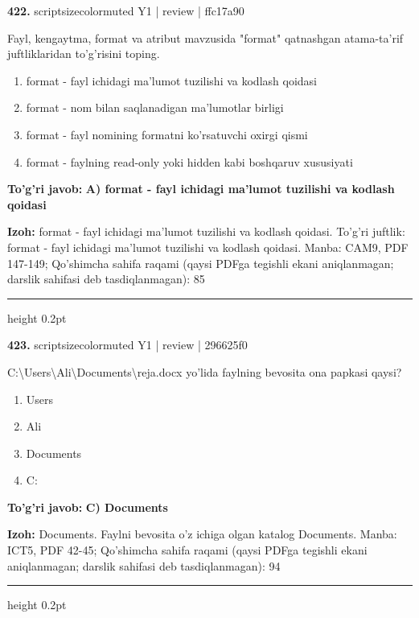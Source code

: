 \documentclass[10pt,a4paper]{article}
\begin{document}
{\bfseries\sffamily\color{ink} 422.} {scriptsizecolor{muted} Y1 | review | ffc17a90}
\par
Fayl, kengaytma, format va atribut mavzusida "format" qatnashgan atama-ta'rif juftliklaridan to'g'risini toping.
\begin{enumerate}[label=\Alph*),leftmargin=9mm]
\item format - fayl ichidagi ma'lumot tuzilishi va kodlash qoidasi
\item format - nom bilan saqlanadigan ma'lumotlar birligi
\item format - fayl nomining formatni ko'rsatuvchi oxirgi qismi
\item format - faylning read-only yoki hidden kabi boshqaruv xususiyati
\end{enumerate}
\begin{tcolorbox}[enhanced,breakable,colback=teal!4,colframe=teal!60!black,boxrule=0.45pt,arc=1.2mm,left=2.7mm,right=2.7mm,top=1.8mm,bottom=1.8mm,before skip=2mm,after skip=2mm]
{\bfseries\sffamily\color{teal}To'g'ri javob:} \textbf{A) format - fayl ichidagi ma'lumot tuzilishi va kodlash qoidasi}
\par\smallskip
{\bfseries Izoh:} format - fayl ichidagi ma'lumot tuzilishi va kodlash qoidasi. To'g'ri juftlik: format - fayl ichidagi ma'lumot tuzilishi va kodlash qoidasi. Manba: CAM9, PDF 147-149; Qo'shimcha sahifa raqami (qaysi PDFga tegishli ekani aniqlanmagan; darslik sahifasi deb tasdiqlanmagan): 85
\end{tcolorbox}
\vspace{2mm}\hrule height 0.2pt\vspace{3mm}

{\bfseries\sffamily\color{ink} 423.} {scriptsizecolor{muted} Y1 | review | 296625f0}
\par
C:\textbackslash{}Users\textbackslash{}Ali\textbackslash{}Documents\textbackslash{}reja.docx yo'lida faylning bevosita ona papkasi qaysi?
\begin{enumerate}[label=\Alph*),leftmargin=9mm]
\item Users
\item Ali
\item Documents
\item C:
\end{enumerate}
\begin{tcolorbox}[enhanced,breakable,colback=teal!4,colframe=teal!60!black,boxrule=0.45pt,arc=1.2mm,left=2.7mm,right=2.7mm,top=1.8mm,bottom=1.8mm,before skip=2mm,after skip=2mm]
{\bfseries\sffamily\color{teal}To'g'ri javob:} \textbf{C) Documents}
\par\smallskip
{\bfseries Izoh:} Documents. Faylni bevosita o'z ichiga olgan katalog Documents. Manba: ICT5, PDF 42-45; Qo'shimcha sahifa raqami (qaysi PDFga tegishli ekani aniqlanmagan; darslik sahifasi deb tasdiqlanmagan): 94
\end{tcolorbox}
\vspace{2mm}\hrule height 0.2pt\vspace{3mm}
\end{document}
